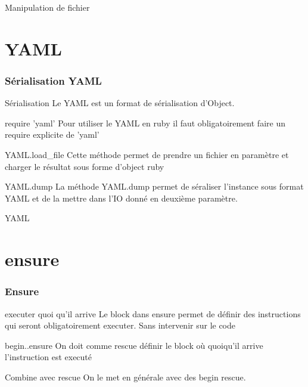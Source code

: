 \documentclass{beamer}
\begin{document}
\begin{frame}
  \begin{beamerboxesrounded}{Manipulation de fichier}
    
  \end{beamerboxesrounded}
\end{frame}

\section{YAML}

\begin{frame}
  \frametitle{S\'erialisation YAML}
  \begin{block}{S\'erialisation}
    Le YAML est un format de s\'erialisation d'Object.
  \end{block}
  \begin{block}{require 'yaml'}
    Pour utiliser le YAML en ruby il faut obligatoirement
    faire un require explicite de 'yaml'
  \end{block}
  \begin{block}{YAML.load\_file}
    Cette m\'ethode permet de prendre un fichier en paramètre
    et charger le r\'esultat sous forme d'object ruby
  \end{block}
  \begin{block}{YAML.dump}
    La m\'ethode YAML.dump permet de s\'eraliser l'instance
    sous format YAML et de la mettre dans l'IO donn\'e en
    deuxième paramètre.
  \end{block}
\end{frame}

\begin{frame}
  \begin{beamerboxesrounded}{YAML}
    
  \end{beamerboxesrounded}
\end{frame}

\section{ensure}

\begin{frame}
  \frametitle{Ensure}
  \begin{block}{executer quoi qu'il arrive}
    Le block dans ensure permet de d\'efinir des instructions
    qui seront obligatoirement executer. Sans intervenir sur le code
  \end{block}
  \begin{block}{begin..ensure}
    On doit comme rescue d\'efinir le block où quoiqu'il arrive
    l'instruction est execut\'e
  \end{block}
  \begin{block}{Combine avec rescue}
    On le met en g\'en\'erale avec des begin rescue.
  \end{block}
\end{frame}
\end{document}
